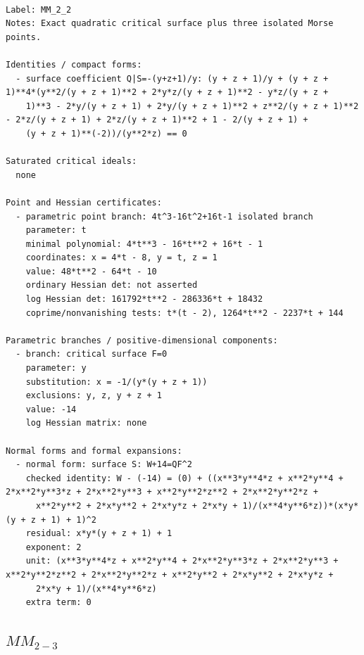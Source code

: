 \documentclass[10pt,a4paper]{article}
\begin{document}
\begin{lstlisting}

Label: MM_2_2
Notes: Exact quadratic critical surface plus three isolated Morse points.

Identities / compact forms:
  - surface coefficient Q|S=-(y+z+1)/y: (y + z + 1)/y + (y + z + 1)**4*(y**2/(y + z + 1)**2 + 2*y*z/(y + z + 1)**2 - y*z/(y + z +
    1)**3 - 2*y/(y + z + 1) + 2*y/(y + z + 1)**2 + z**2/(y + z + 1)**2 - 2*z/(y + z + 1) + 2*z/(y + z + 1)**2 + 1 - 2/(y + z + 1) +
    (y + z + 1)**(-2))/(y**2*z) == 0

Saturated critical ideals:
  none

Point and Hessian certificates:
  - parametric point branch: 4t^3-16t^2+16t-1 isolated branch
    parameter: t
    minimal polynomial: 4*t**3 - 16*t**2 + 16*t - 1
    coordinates: x = 4*t - 8, y = t, z = 1
    value: 48*t**2 - 64*t - 10
    ordinary Hessian det: not asserted
    log Hessian det: 161792*t**2 - 286336*t + 18432
    coprime/nonvanishing tests: t*(t - 2), 1264*t**2 - 2237*t + 144

Parametric branches / positive-dimensional components:
  - branch: critical surface F=0
    parameter: y
    substitution: x = -1/(y*(y + z + 1))
    exclusions: y, z, y + z + 1
    value: -14
    log Hessian matrix: none

Normal forms and formal expansions:
  - normal form: surface S: W+14=QF^2
    checked identity: W - (-14) = (0) + ((x**3*y**4*z + x**2*y**4 + 2*x**2*y**3*z + 2*x**2*y**3 + x**2*y**2*z**2 + 2*x**2*y**2*z +
      x**2*y**2 + 2*x*y**2 + 2*x*y*z + 2*x*y + 1)/(x**4*y**6*z))*(x*y*(y + z + 1) + 1)^2
    residual: x*y*(y + z + 1) + 1
    exponent: 2
    unit: (x**3*y**4*z + x**2*y**4 + 2*x**2*y**3*z + 2*x**2*y**3 + x**2*y**2*z**2 + 2*x**2*y**2*z + x**2*y**2 + 2*x*y**2 + 2*x*y*z +
      2*x*y + 1)/(x**4*y**6*z)
    extra term: 0

\end{lstlisting}

\subsection*{$ MM_{2-3} $}
\end{document}
